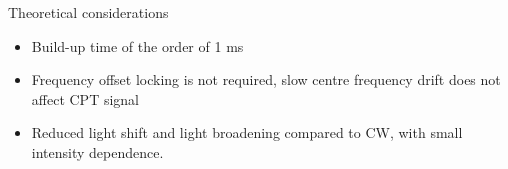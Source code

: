 \begin{block}{Theoretical considerations}
  \begin{itemize}
  \item Build-up time of the order of 1 ms
  \item Frequency offset locking is not required, slow centre frequency drift does not affect CPT signal
  \item Reduced light shift and light broadening compared to CW, with small intensity dependence.
  \end{itemize}
  \begin{columns}
    \begin{column}{0.49\textwidth}
      \begin{figure}
        \begin{center}
          \setlength\fboxsep{0pt}
          \setlength\fboxrule{0.5pt}
        \end{center}
      \end{figure}
    \end{column}
    \begin{column}{0.49\textwidth}
      \begin{figure}
        \begin{center}
          \setlength\fboxsep{0pt}
          \setlength\fboxrule{0.5pt}
        \end{center}
      \end{figure}
    \end{column}
  \end{columns}
\end{block}
